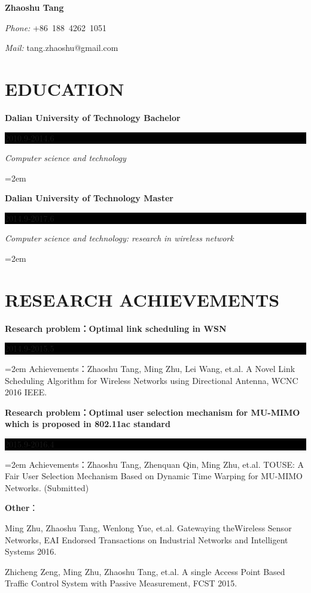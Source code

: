 \documentclass[paper=a4,fontsize=11pt]{scrartcl} %
\newcommand{\sepspace}{\vspace*{1em}}		%
\newcommand{\MyName}[1]{ %
		\Huge \usefont{OT1}{phv}{b}{n} %
         \textbf{#1} \hfill
		\normalfont\normalsize}
\newcommand{\MySlogan}[1]{ %
		\large \usefont{OT1}{phv}{m}{n} \textit{#1}
		\par \normalsize \normalfont}
\newcommand{\NewPart}[1]{\section*{\uppercase{#1}}}
\newcommand{\PersonalEntry}[2]{
		\hfill %
		\textit{#1}		       %
		#2 \par}    %
\newcommand{\EducationEntry}[4]{
		\noindent \textbf{#1} \hfill      %
		\colorbox{Black}{%
			\parbox{6em}{%
			\hfill\color{White}#2}} \par  %
		\noindent \textit{#3} \par        %
		\noindent\hangindent=2em\hangafter=0 \small #4 %
		\normalsize \par}
\begin{document}
\begin{CJK}{UTF8}{gbsn}
\vspace*{-1.3cm}
\MyName{Zhaoshu Tang}
\PersonalEntry{Phone:}{+86~188~4262~1051}
\PersonalEntry{Mail:}{tang.zhaoshu@gmail.com}

\sepspace



\NewPart{Education}{}

\EducationEntry{Dalian University of Technology
Bachelor}{2010.9-2014.6}{ Computer science and technology}{}

\EducationEntry{Dalian University of Technology
Master}{2014.9-2017.6}{ Computer science and technology: \emph{research in wireless network}}{}
\vspace*{-0.5cm}
\NewPart{Research Achievements}{}

\EducationEntry{Research problem：Optimal link scheduling in WSN
}{2014.9-2015.5}{}{Achievements：Zhaoshu Tang, Ming Zhu, Lei Wang, et.al. A Novel Link Scheduling Algorithm for Wireless Networks using Directional Antenna, WCNC 2016 IEEE.}
\sepspace

\EducationEntry{Research problem：Optimal user selection mechanism for MU-MIMO which is proposed in 802.11ac standard}{2015.9-2016.4}{}{Achievements：Zhaoshu Tang, Zhenquan Qin, Ming Zhu, et.al. TOUSE: A Fair User Selection Mechanism Based on Dynamic Time Warping for MU-MIMO Networks. (Submitted)}
\par
\sepspace
\noindent\textbf{Other}：\normalfont \normalsize\par
Ming Zhu, Zhaoshu Tang, Wenlong Yue, et.al. Gatewaying theWireless Sensor Networks, EAI Endorsed Transactions on Industrial Networks and Intelligent Systems 2016.
\par
Zhicheng Zeng, Ming Zhu, Zhaoshu Tang, et.al. A single Access Point Based Traffic Control System with Passive Measurement, FCST 2015.


\end{CJK}
\end{document}
